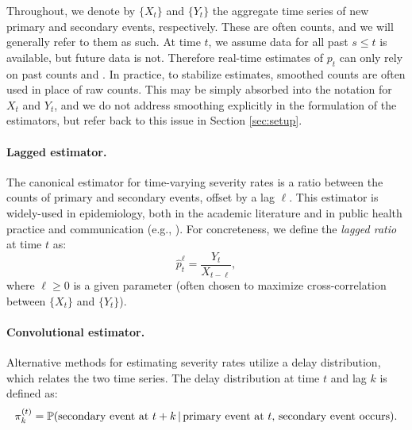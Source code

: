 \documentclass{article}
\renewcommand{\hat}{\widehat} %
\newcommand{\given}{\, \vert \,}
\begin{document}
Throughout, we denote by $\{X_t\}$ and $\{Y_t\}$ the aggregate time series of 
new primary and secondary events, respectively. These are often counts, and we
will generally refer to them as such. At time $t$, we assume data for all past
$s \leq t$ is available, but future data is not. Therefore real-time estimates of
$p_t$ can only rely on past counts  and
. In practice, to stabilize estimates, smoothed
counts are often used in place of raw counts. This may be simply absorbed into 
the notation for $X_t$ and $Y_t$, and we do not address smoothing explicitly in
the formulation of the estimators, but refer back to this issue in Section
\ref{sec:setup}.  

\paragraph{Lagged estimator.} 

The canonical estimator for time-varying severity rates is a ratio between
the counts of primary and secondary events, offset by a lag $\ell$. This
estimator is widely-used in epidemiology, both in the academic literature and in 
public health practice and communication (e.g., \citealp{wsj, atlantic,
  yuan2020monitoring, timevar_ifr, thomas2021estimating, horita2022global,
  LIU2023100350, germany}). For concreteness, we define the \emph{lagged ratio} 
at time $t$ as:   
\begin{equation}
\label{eq:lagged}
\hat{p}_t^\ell = \frac{Y_t}{X_{t-\ell}},
\end{equation}
where $\ell \geq 0$ is a given parameter (often chosen to maximize
cross-correlation between $\{X_t\}$ and $\{Y_t\}$).      

\paragraph{Convolutional estimator.} 

Alternative methods for estimating severity rates utilize a delay distribution,
which relates the two time series. The delay distribution at time $t$ and lag
$k$ is defined as: 
\[
\pi_k^{(t)} = \P(\text{secondary event at $t+k$} \given \text{primary event at
  $t$, secondary event occurs}).  
\]
\end{document}
